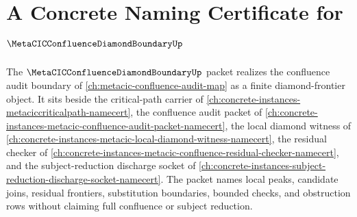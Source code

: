 \chapter{A Concrete Naming Certificate for $\MetaCICConfluenceDiamondBoundaryUp$}
\label{ch:concrete-instances-metacic-confluence-diamond-boundary-namecert}

The $\MetaCICConfluenceDiamondBoundaryUp$ packet realizes the confluence audit boundary of \autoref{ch:metacic-confluence-audit-map} as a finite diamond-frontier object. It sits beside the critical-path carrier of \autoref{ch:concrete-instances-metaciccriticalpath-namecert}, the confluence audit packet of \autoref{ch:concrete-instances-metacic-confluence-audit-packet-namecert}, the local diamond witness of \autoref{ch:concrete-instances-metacic-local-diamond-witness-namecert}, the residual checker of \autoref{ch:concrete-instances-metacic-confluence-residual-checker-namecert}, and the subject-reduction discharge socket of \autoref{ch:concrete-instances-subject-reduction-discharge-socket-namecert}. The packet names local peaks, candidate joins, residual frontiers, substitution boundaries, bounded checks, and obstruction rows without claiming full confluence or subject reduction.



